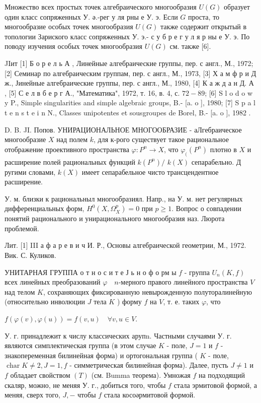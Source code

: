 \documentclass[10pt]{article}
\begin{document}
Множество всех простых точек алгебраического многообразия $U(G)$ образует один класс сопряженных У. ә.-рег у ля рны е У. э. Если $G$ проста, то многообразие особых точек многообразия $U(G)$ также содержит открытый в топологии Зариского класс сопряженных У. э.- с у б р е г у л я р ны е У. э. По поводу изучения особых точек многообразия $U(G)$ см. также [6].



JIит [1] Б о р е л ь А , Линейные алгебраические группы, пер. с англ., М., 1972; [2] Семинар по алгебраическим группам, пер. с англ., М., 1973, [3] Х а м ф р и Д ж., Јинейные алгебраические группы, пер. с англ., М., 1980, [4] К а ж д а н Д. А , [5] С е л в б е р г А., "Математика", 1972, т. 16, в. 4, с. $72-89$; [6] S l o d o w y P., Simple singularities and simple algebraic groups, B.- [a. o ], 1980; [7] S p a l t e n s t e i n N., Classes unipotentes et sousgroupes de Borel, B.- [a. o ], 1982 .



D. B. JI. Попов. УНИРАЦИОНАЛЬНОЕ МНОГООБРАЗИЕ - аЛгебраическое многообразие $X$ над полем $k$, для к-рого существует такое рациональное отображение проективного пространства $\varphi: P^{n} \rightarrow X$, что $\varphi_{(}\left(P^{n}\right)$ плотно в $X$ и расширение полей рациональных функций $k\left(P^{n}\right) /$ $k(X)$ сепарабельно. Д ругими словами, $k(X)$ имеет сепарабельное чисто трансцендентное расширение.



У. м. близки к рациональныл многообразиял. Напр., на У. м. нет регулярных дифференциальных форм, $H^{0}\left(X, \Omega_{X}^{p}\right)=0$ при $p \geqslant 1$. Вопрос о совпадении понятий рационального и унирационального многообразия наз. Люрота проблемой.



Лит. [1] III а ф а р е в и ч И. Р., Основы алгебраической геометрии, М., 1972. Вик. С. Куликов.



УНИТАРНАЯ ГРУППА о т н о с и т е Ј ь н о ф о рм ы $f$ - группа $U_{n}(K, f)$ всех линейных преобразований $\varphi \quad n$-мерного правого линейного пространства $V$ над телом $K$, сохраняющих фиксированную невырожденную полуторалинейную (относительно инволюции $J$ тела $K$ ) форму $f$ на $V$, т. е. таких $\varphi$, что



$f(\varphi(v), \varphi(u))=f(v, u) \quad \forall v, u \in V$.



У. г. принадлежит к числу классических арупn. Частными случаями У. г. являются симплектическая группа (в этом случае $K$ - поле, $J=1$ и $f$ - знакопеременная билинейная форма) и ортогональная группа ( $K$ - поле, $\operatorname{char} K \neq 2, J=1, f$ - симметрическая билинейная форма). Далее, пусть $J \neq 1$ и $f$ обладает свойством $(T)$ (см. Bumma теорема). Умножая $f$ на подходящий скаляр, можно, не меняя У. г., добиться того, чтобы $f$ стала эрмитовой формой, а меняя, сверх того, $J,-$ чтобы $f$ стала косоәрмитовой формой.
\end{document}
